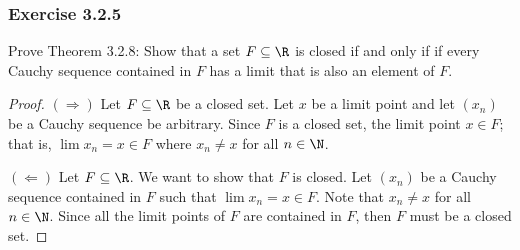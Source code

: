 \subsubsection{Exercise 3.2.5} Prove Theorem 3.2.8:
Show that a set \( F \subseteq \R  \) is closed if and only if if every Cauchy sequence contained in \( F \) has a limit that is also an element of \( F \). 
\begin{proof}
\( (\Rightarrow) \) Let \( F \subseteq \R  \) be a closed set. Let \( x  \) be a limit point and let \( (x_n) \) be a Cauchy sequence be arbitrary. Since \( F \) is a closed set, the limit point \( x \in F \); that is, \( \lim x_n = x \in F  \) where \( x_n \neq x  \) for all \( n \in \N \). 

\( (\Leftarrow) \) Let \( F \subseteq \R  \). We want to show that \( F  \) is closed. Let \( (x_n) \) be a Cauchy sequence contained in \( F \) such that \( \lim x_n = x \in F \). Note that \( x_n \neq x  \) for all \( n \in \N \). Since all the limit points of \( F \) are contained in \( F \), then \( F \) must be a closed set. 
\end{proof}

